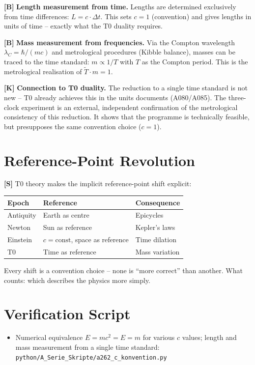\textbf{[B]} \textbf{Length measurement from time.} Lengths are determined
exclusively from time differences: $L=c\cdot\Delta t$. This sets $c=1$ (convention)
and gives lengths in units of time -- exactly what the T0 duality requires.

\textbf{[B]} \textbf{Mass measurement from frequencies.} Via the Compton wavelength
$\lambda_C=\hbar/(mc)$ and metrological procedures (Kibble balance), masses can be
traced to the time standard: $m\propto1/T$ with $T$ as the Compton period. This is
the metrological realisation of $\tilde T\cdot m=1$.

\textbf{[K]} \textbf{Connection to T0 duality.} The reduction to a single time
standard is not new -- T0 already achieves this in the units documents (A080/A085).
The three-clock experiment is an external, independent confirmation of the metrological
consistency of this reduction. It shows that the programme is technically feasible,
but presupposes the same convention choice ($c=1$).

\section{Reference-Point Revolution}

\textbf{[S]} T0 theory makes the implicit reference-point shift explicit:
\begin{center}
\renewcommand{\arraystretch}{1.3}
{\small
\begin{tabular}{lll}
\toprule
Epoch & Reference & Consequence \\
\midrule
Antiquity & Earth as centre & Epicycles \\
Newton & Sun as reference & Kepler's laws \\
Einstein & $c=\text{const}$, space as reference & Time dilation \\
T0 & Time as reference & Mass variation \\
\bottomrule
\end{tabular}
}
\renewcommand{\arraystretch}{1.0}
\end{center}
Every shift is a convention choice -- none is ``more correct'' than another.
What counts: which describes the physics more simply.

\section{Verification Script}

\begin{itemize}[leftmargin=2em,itemsep=2pt,topsep=2pt]
  \item Numerical equivalence $E=mc^2=E=m$ for various $c$ values; length and
    mass measurement from a single time standard:
    \texttt{python/A\_Serie\_Skripte/a262\_c\_konvention.py}
\end{itemize}


